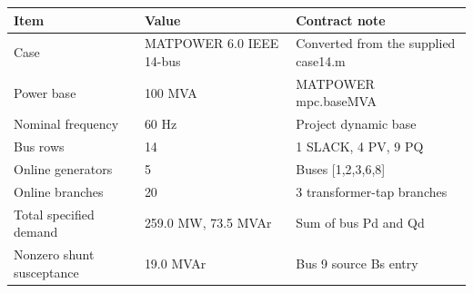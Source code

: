 \begin{tabular}{lll}\toprule
Item & Value & Contract note \\ \midrule
Case & {MATPOWER 6.0 IEEE 14-bus} & Converted from the supplied case14.m \\ 
Power base & 100 MVA & MATPOWER mpc.baseMVA \\ 
Nominal frequency & 60 Hz & Project dynamic base \\ 
Bus rows & 14 & 1 SLACK, 4 PV, 9 PQ \\ 
Online generators & 5 & Buses [1,2,3,6,8] \\ 
Online branches & 20 & 3 transformer-tap branches \\ 
Total specified demand & 259.0 MW, 73.5 MVAr & Sum of bus Pd and Qd \\ 
Nonzero shunt susceptance & 19.0 MVAr & Bus 9 source Bs entry \\ 
\bottomrule\end{tabular}
